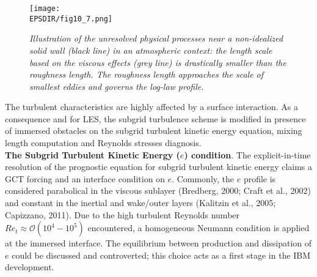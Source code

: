 \begin{figure}[!ht]
\begin{center}
   \texttt{[image: \\EPSDIR/fig10\_7.png]}	\\
   \vspace{-1mm} 
	\small \caption {{\it Illustration of the unresolved physical processes near a non-idealized solid wall (black line) in an atmospheric context: the length scale based on the viscous effects (grey line) is drastically smaller than the roughness length. The roughness length approaches the scale of smallest eddies and governs the log-law profile.}}
	\label{roughness}
\end{center}
\end{figure}

The turbulent characteristics are highly affected by a surface interaction. As a consequence and for LES, the subgrid turbulence scheme is modified in presence of immersed obstacles on the subgrid turbulent kinetic energy equation, mixing length computation and Reynolds stresses diagnosis.\\

{\bf The Subgrid Turbulent Kinetic Energy ($e$) condition}. The explicit-in-time resolution of the prognostic equation for subgrid turbulent kinetic energy claims a GCT forcing and an interface condition on $e$. Commonly, the $e$ profile is considered parabolical in the viscous sublayer (Bredberg, 2000; Craft et al., 2002) and constant in the inertial and wake/outer layers (Kalitzin et al., 2005; Capizzano, 2011). Due to the high turbulent Reynolds number $Re_t \approx {\mathcal O}(10^4-10^5)$ encountered, a homogeneous Neumann condition is applied at the immersed interface. The equilibrium between production and dissipation of $e$ could be discussed and controverted; this choice acts as a first stage in the IBM development.\\ 
 
